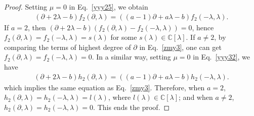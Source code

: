 \documentclass[11pt,letterpaper,reqno]{amsart}
\theoremstyle{definition}
\numberwithin{equation}{section}
\begin{document}
\begin{proof}
Setting $\mu=0$ in Eq.~\eqref{yyy25}, we obtain
\begin{align}\label{zmy3}
(\partial+2\lambda-b)f_2(\partial, \lambda)=((a-1)\partial+a\lambda-b)f_2(-\lambda, \lambda).
\end{align}
If $a=2$, then $(\partial+2\lambda-b)(f_2(\partial, \lambda)-f_2(-\lambda, \lambda))=0$, hence $f_2(\partial, \lambda)=f_2(-\lambda, \lambda)=s(\lambda)$ for some $s(\lambda)\in\mathbb{C}[\lambda]$.
If $a\neq2$, by comparing the terms of highest degree of $\partial$ in Eq.~\eqref{zmy3}, one can get $f_2(\partial, \lambda)=f_2(-\lambda, \lambda)=0$.
In a similar way, setting $\mu=0$ in Eq.~\eqref{yyy32}, we have
\begin{align}\label{zmy4}
(\partial+2\lambda-b)h_2(\partial, \lambda)=((a-1)\partial+a\lambda-b)h_2(-\lambda, \lambda).
\end{align}
which implies the same equation as Eq.~\eqref{zmy3}. Therefore, when $a=2$, $h_2(\partial, \lambda)=h_2(-\lambda, \lambda)=l(\lambda)$, where $l(\lambda)\in\mathbb{C}[\lambda]$;
and when $a\neq2$, $h_2(\partial, \lambda)=h_2(-\lambda, \lambda)=0$.
This ends the proof.
\end{proof}
\end{document}
